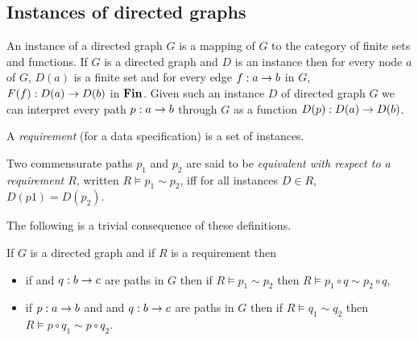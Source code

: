 \documentclass[10pt,a4paper]{article}
\theoremstyle{remark}
\renewcommand{\term}[1]{\textit{#1}}  %
\begin{document}
\subsection{Instances of directed graphs}
An instance of a directed graph $G$ is a mapping of $G$ to the category of finite sets and functions.
If $G$ is a directed graph and $D$ is an instance then for every node $a$ of $G$, $D(a)$ is a finite set
and for every edge $f:a \rightarrow b$ in $G$, $F(f):D(a) \rightarrow D(b)$ in $\textbf{Fin}$. Given such an instance $D$ of 
directed graph $G$ we can interpret every path $p:a \rightarrow b$ through $G$ as a function $D(p): D(a) \rightarrow D(b)$.

A \term{requirement} (for a data specification) is a set of instances. 

Two commensurate paths $p_1$ and $p_2$ are  said to be \term{equivalent with respect to a requirement $R$}, 
written $R \models p_1 \sim p_2$, iff 
for all instances $D \in R$, $D(p1)=D(p_2)$.

The following is a trivial consequence of these definitions.
\begin{lemma}
\label{pathequivalenceinference}
If $G$ is a directed graph and if $R$ is a requirement then 
\begin{itemize}
\item if  and $q: b \rightarrow c$ are paths in $G$ then if $R \models p_1 \sim p_2$  
then $R \models p_1 \circ q \sim p_2 \circ q$,
\item if $p: a \rightarrow b$ and  and $q: b \rightarrow c$ are paths in $G$ then if $R \models q_1 \sim q_2$  
then $R \models p \circ q_1 \sim p \circ q_2$.
\end{itemize}
\end{lemma}
\end{document}

